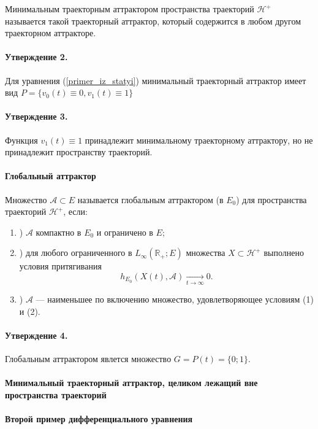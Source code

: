 \opred
Минимальным траекторным аттрактором пространства траекторий $\mathcal{H}^+$
называется такой траекторный аттрактор, который содержится в любом другом траекторном аттракторе.

\paragraph{Утверждение 2.}
Для уравнения (\ref{primer_iz_statyi}) минимальный траекторный аттрактор имеет вид
$
	P = \{ v_0(t) \equiv 0, v_1(t) \equiv 1\}
$

\paragraph{Утверждение 3.}
Функция $v_1(t) \equiv 1$ принадлежит минимальному траекторному аттрактору,
но не принадлежит пространству траекторий.


\paragraph{Глобальный аттрактор}

\opred

Множество  $\mathcal{A} \subset E $ называется глобальным аттрактором (в $E_0$) для пространства траекторий $\mathcal{H}^+$, если:
\begin{enumerate}
	\item)
		$\mathcal{A}$ компактно в $E_0$ и ограничено в $E$;
	\item)
		для любого ограниченного в $L_\infty(\mathbb{R}_+; E)$ множества $X \subset \mathcal{H}^+$
		выполнено условия притягивания
		$$
			h_{E_0}(X(t),\mathcal{A}) \xrightarrow[t\to \infty]{}{0}.
		$$
	\item)
		$\mathcal{A}$ --- наименьшее по включению множество, удовлетворяющее условиям (1) и (2).
\end{enumerate}

\paragraph{Утверждение 4.}
Глобальным аттрактором явлется множество $G = P(t) = \{0; 1\}$.

\paragraph{Минимальный траекторный аттрактор, целиком лежащий вне пространства траекторий}

\paragraph{Второй пример дифференциального уравнения}


